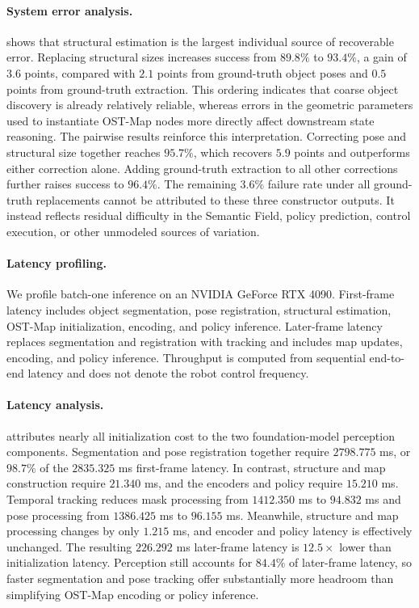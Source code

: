 \paragraph{System error analysis.}
 shows that structural estimation is the largest
individual source of recoverable error. Replacing structural sizes increases
success from $89.8\%$ to $93.4\%$, a gain of $3.6$ points, compared with
$2.1$ points from ground-truth object poses and $0.5$ points from
ground-truth extraction. This ordering indicates that coarse object discovery
is already relatively reliable, whereas errors in the geometric parameters
used to instantiate OST-Map nodes more directly affect downstream state
reasoning. The pairwise results reinforce this interpretation. Correcting pose
and structural size together reaches $95.7\%$, which recovers $5.9$ points and
outperforms either correction alone. Adding ground-truth extraction to all
other corrections further raises success to $96.4\%$. The remaining
$3.6\%$ failure rate under all ground-truth replacements cannot be attributed
to these three constructor outputs. It instead reflects residual difficulty in
the Semantic Field, policy prediction, control execution, or other unmodeled
sources of variation.

\paragraph{Latency profiling.}
We profile batch-one inference on an NVIDIA GeForce RTX 4090. First-frame
latency includes object segmentation, pose registration, structural
estimation, OST-Map initialization, encoding, and policy inference. Later-frame
latency replaces segmentation and registration with tracking and includes map
updates, encoding, and policy inference. Throughput is computed from sequential
end-to-end latency and does not denote the robot control frequency.

\paragraph{Latency analysis.}
 attributes nearly all initialization cost to the two
foundation-model perception components. Segmentation and pose registration
together require $2798.775$ ms, or $98.7\%$ of the $2835.325$ ms first-frame
latency. In contrast, structure and map construction require $21.340$ ms, and
the encoders and policy require $15.210$ ms. Temporal tracking reduces mask
processing from $1412.350$ ms to $94.832$ ms and pose processing from
$1386.425$ ms to $96.155$ ms. Meanwhile, structure and map processing changes
by only $1.215$ ms, and encoder and policy latency is effectively unchanged.
The resulting $226.292$ ms later-frame latency is $12.5\times$ lower than
initialization latency. Perception still accounts for $84.4\%$ of later-frame
latency, so faster segmentation and pose tracking offer substantially more
headroom than simplifying OST-Map encoding or policy inference.


